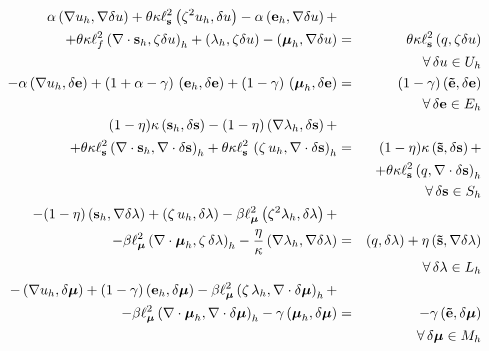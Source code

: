 \begin{eqnarray}
	\alpha \left ( \nabla u_h, \nabla \delta u \right ) + \theta \kappa \ell_{\mathbf{s}}^2  \left ( \zeta^2 u_h, \delta u \right ) - \alpha \left ( \mathbf{e}_h,\nabla \delta u \right ) + & & \nonumber \\ 
	 + \theta \kappa \ell_f^2  \left ( \nabla \cdot \mathbf{s}_h, \zeta \delta u \right )_h + \left ( \lambda_h, \zeta\delta u \right ) - \left ( \boldsymbol{\mu}_h, \nabla \delta u \right ) & = & \theta \kappa \ell_{\mathbf{s}}^2  \left ( q, \zeta\delta u \right )\nonumber \\ & & \quad \forall \,\delta u \in U_h  \label{eq:var1h} \\ 
	-\alpha \left ( \nabla u_h, \delta \mathbf{e} \right ) +(1+\alpha-\gamma)\,\left ( \mathbf{e}_h,\delta \mathbf{e} \right )+ (1-\gamma)\, \left ( \boldsymbol{\mu}_h, \delta \mathbf{e} \right ) &=& \left (1-\gamma)\,( \mathbf{\tilde{e}}, \delta \mathbf{e} \right )  \nonumber \\ & &\quad \forall \,\delta \mathbf{e} \in E_h\label{eq:var2h}\\
	(1-\eta)\kappa \left ( \mathbf{s}_h, \delta \mathbf{s} \right ) - (1-\eta)\left ( \nabla \lambda_h, \delta \mathbf{s} \right ) + & & \nonumber \\
	+\theta \kappa \ell_{\mathbf{s}}^2  \left ( \nabla \cdot \mathbf{s}_h, \nabla \cdot \delta \mathbf{s} \right )_h+ \theta \kappa \ell_{\mathbf{s}}^2 \,\left (\zeta\,u_h, \nabla \cdot \delta \mathbf{s} \right )_h & = & (1-\eta)\kappa \left ( \mathbf{\tilde{s}},\delta \mathbf{s} \right ) + \nonumber \\ & &+\theta \kappa \ell_{\mathbf{s}}^2  \left ( q , \nabla \cdot \delta \mathbf{s} \right )_h \nonumber \\ & & \quad \forall\, \delta \mathbf{s} \in S_h \label{eq:var3h}\\
	-(1-\eta)\left ( \mathbf{s}_h,\nabla \delta \lambda\right ) + \left ( \zeta\,u_h,\delta \lambda \right ) - \beta \ell_{\boldsymbol{\mu}}^2 \left ( \zeta^2 \lambda_h, \delta \lambda\right )+ & & \nonumber \\
	- \beta \ell_{\boldsymbol{\mu}}^2 \left ( \nabla \cdot \boldsymbol{\mu}_h, \zeta\,\delta \lambda \right )_h -\frac{\eta}{\kappa} \left ( \nabla \lambda_h , \nabla \delta \lambda \right )&=&\left ( q,\delta \lambda \right ) + \eta \left ( \mathbf{\tilde{s}},\nabla \delta \lambda \right ) \nonumber \\ & & \quad \forall\,\delta \lambda \in L_h\label{eq:var4h} \\
	-\left (\nabla u_h,\delta \boldsymbol{\mu} \right )+(1-\gamma)\left ( \mathbf{e}_h,\delta \boldsymbol{\mu} \right )
	- \beta \ell_{\boldsymbol{\mu}}^2 \left ( \zeta\,\lambda_h, \nabla \cdot \delta \boldsymbol{\mu} \right )_h + & & \nonumber \\- \beta \ell_{\boldsymbol{\mu}}^2 \left ( \nabla \cdot \boldsymbol{\mu}_h, \nabla \cdot \delta \boldsymbol{\mu} \right )_h - \gamma \left ( \boldsymbol{\mu}_h,\delta \boldsymbol{\mu} \right ) & = & -\gamma \left (\mathbf{\tilde{e}},\delta \boldsymbol{\mu} \right ) \nonumber \\ & & \quad \forall\,\delta \boldsymbol{\mu} \in M_h \label{eq:var5h}
\end{eqnarray}

